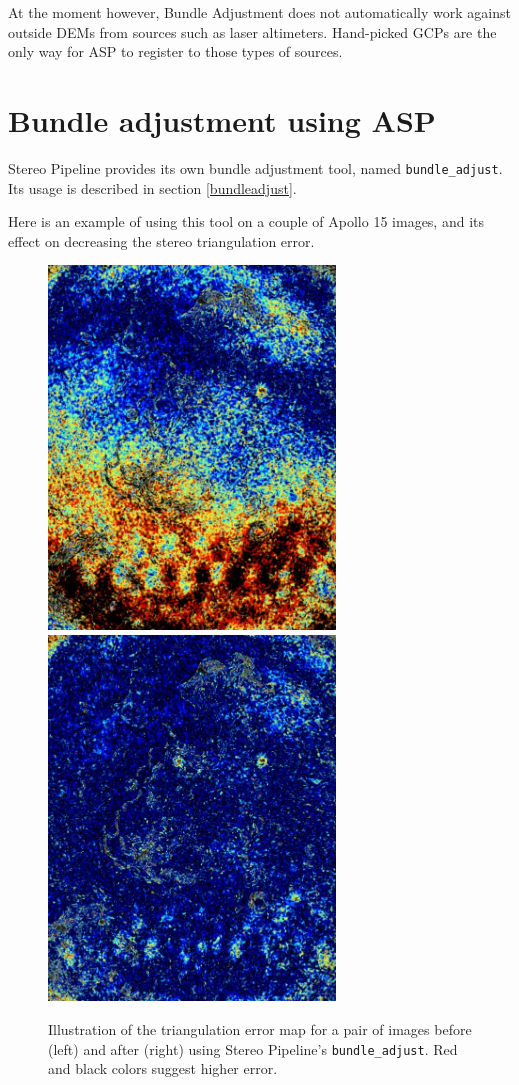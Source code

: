 At the moment however, Bundle Adjustment does not automatically work
against outside \acp{DEM} from sources such as laser altimeters.
Hand-picked \acp{GCP} are the only way for \ac{ASP} to register to those
types of sources.

\section{Bundle adjustment using ASP}
\label{baasp}

Stereo Pipeline provides its own bundle adjustment
tool, named \texttt{bundle\_adjust}. Its usage is described in section
\ref{bundleadjust}.

Here is an example of using this tool on a couple of Apollo 15 images,
and its effect on decreasing the stereo triangulation error.

\begin{figure}[h!]
\centering
  \includegraphics[width=3.0in]{images/examples/before_ba.jpg}
  \includegraphics[width=3.0in]{images/examples/after_ba.jpg}
\caption{Illustration of the triangulation error map for a pair of
  images before (left) and after (right) using Stereo Pipeline's
  \texttt{bundle\_adjust}. Red and black colors suggest higher error.}
\label{fig:asp-ba-example}
\end{figure}

